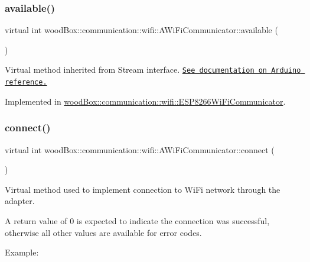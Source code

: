 \subsubsection{\texorpdfstring{available()}{available()}}
{\footnotesize\ttfamily virtual int wood\+Box\+::communication\+::wifi\+::\+A\+Wi\+Fi\+Communicator\+::available (\begin{DoxyParamCaption}{ }\end{DoxyParamCaption})\hspace{0.3cm}{\ttfamily [pure virtual]}}

Virtual method inherited from Stream interface. \href{https://www.arduino.cc/reference/en/language/functions/communication/stream/streamavailable/}{\tt See documentation on Arduino reference.} 

Implemented in \mbox{\hyperlink{classwood_box_1_1communication_1_1wifi_1_1_e_s_p8266_wi_fi_communicator_aa73f46aaaf5441b79dd4a15be293aeb4}{wood\+Box\+::communication\+::wifi\+::\+E\+S\+P8266\+Wi\+Fi\+Communicator}}.

\mbox{\label{classwood_box_1_1communication_1_1wifi_1_1_a_wi_fi_communicator_a7c4763c1594a4b934e5a39e90b271799}} 
\subsubsection{\texorpdfstring{connect()}{connect()}}
{\footnotesize\ttfamily virtual int wood\+Box\+::communication\+::wifi\+::\+A\+Wi\+Fi\+Communicator\+::connect (\begin{DoxyParamCaption}{ }\end{DoxyParamCaption})\hspace{0.3cm}{\ttfamily [pure virtual]}}

Virtual method used to implement connection to Wi\+Fi network through the adapter.

A return value of 0 is expected to indicate the connection was successful, otherwise all other values are available for error codes.

Example\+:


